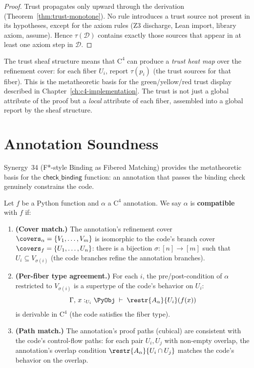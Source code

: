 \begin{proof}
Trust propagates only upward through the derivation (Theorem~\ref{thm:trust-monotone}).
No rule introduces a trust source not present in its hypotheses,
except for the axiom rules (Z3 discharge, Lean import, library axiom, assume).
Hence $\tau(\mathcal{D})$ contains exactly those sources that appear
in at least one axiom step in $\mathcal{D}$.
\end{proof}

\begin{remark}
The trust sheaf structure means that $\mathrm{C}^4$ can produce a
\emph{trust heat map} over the refinement cover: for each fiber $U_i$,
report $\tau(p_i)$ (the trust sources for that fiber).  This is the
metatheoretic basis for the green/yellow/red trust display described
in Chapter~\ref{ch:c4-implementation}.  The trust is not just a
global attribute of the proof but a \emph{local} attribute of each
fiber, assembled into a global report by the sheaf structure.
\end{remark}


\section{Annotation Soundness}
\label{sec:binding-soundness}

Synergy~34 (F*-style Binding as Fibered Matching) provides the
metatheoretic basis for the $\mathsf{check\_binding}$ function:
an annotation that passes the binding check genuinely constrains the code.

\begin{definition}
\label{def:annotation-compat}
Let $f$ be a Python function and $\alpha$ a $\mathrm{C}^4$ annotation.
We say $\alpha$ is \textbf{compatible} with $f$ if:
\begin{enumerate}
\item \textbf{(Cover match.)} The annotation's refinement cover
  $\covers_\alpha = \{V_1, \ldots, V_m\}$ is isomorphic to the
  code's branch cover $\covers_f = \{U_1, \ldots, U_n\}$:
  there is a bijection $\sigma : [n] \to [m]$ such that
  $U_i \subseteq V_{\sigma(i)}$ (the code branches refine the
  annotation branches).
\item \textbf{(Per-fiber type agreement.)} For each $i$, the pre/post-condition
  of $\alpha$ restricted to $V_{\sigma(i)}$ is a supertype of the
  code's behavior on $U_i$:
  \[
    \Gamma,\, x :_{{U_i}} \PyObj
    \;\vdash\;
    \restr{A_\alpha}{U_i}(f(x))
  \]
  is derivable in $\mathrm{C}^4$ (the code satisfies the fiber type).
\item \textbf{(Path match.)} The annotation's proof paths (cubical)
  are consistent with the code's control-flow paths:
  for each pair $U_i, U_j$ with non-empty overlap,
  the annotation's overlap condition $\restr{A_\alpha}{U_i \cap U_j}$
  matches the code's behavior on the overlap.
\end{enumerate}
\end{definition}

